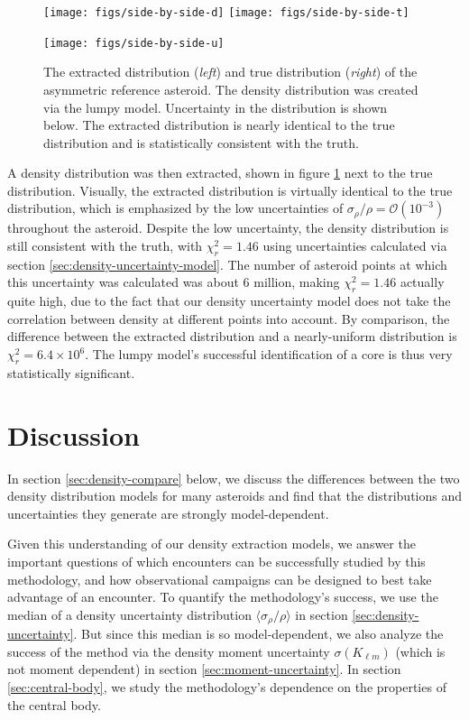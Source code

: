 \documentclass[fleqn,usenatbib]{mnras}
\begin{document}
\begin{figure}
  \centering
  \texttt{[image: figs/side-by-side-d]}\hfill
  \texttt{[image: figs/side-by-side-t]}

  \texttt{[image: figs/side-by-side-u]}
  \caption{The extracted distribution (\textit{left}) and true distribution (\textit{right}) of the asymmetric reference asteroid. The density distribution was created via the lumpy model. Uncertainty in the distribution is shown below. The extracted distribution is nearly identical to the true distribution and is statistically consistent with the truth.}
  \label{fig:den-side-by-side}
\end{figure}

A density distribution was then extracted, shown in figure \ref{fig:den-side-by-side} next to the true distribution. Visually, the extracted distribution is virtually identical to the true distribution, which is emphasized by the low uncertainties of $\sigma_\rho / \rho = \mathcal{O}(10^{-3})$ throughout the asteroid. Despite the low uncertainty, the density distribution is still consistent with the truth, with $\chi^2_r = 1.46$ using uncertainties calculated via section \ref{sec:density-uncertainty-model}. The number of asteroid points at which this uncertainty was calculated was about 6 million, making $\chi^2_r = 1.46$ actually quite high, due to the fact that our density uncertainty model does not take the correlation between density at different points into account. By comparison, the difference between the extracted distribution and a nearly-uniform distribution is $\chi^2_r = 6.4 \times 10^{6}$. The lumpy model's successful identification of a core is thus very statistically significant.



\section{Discussion}
\label{sec:discussion}
In section \ref{sec:density-compare} below, we discuss the differences between the two density distribution models for many asteroids and find that the distributions and uncertainties they generate are strongly model-dependent.

Given this understanding of our density extraction models, we answer the important questions of which encounters can be successfully studied by this methodology, and how observational campaigns can be designed to best take advantage of an encounter. To quantify the methodology's success, we use the median of a density uncertainty distribution $\langle \sigma_\rho / \rho \rangle$ in section \ref{sec:density-uncertainty}. But since this median is so model-dependent, we also analyze the success of the method via the density moment uncertainty $\sigma (K_{\ell m})$ (which is not moment dependent) in section \ref{sec:moment-uncertainty}. In section \ref{sec:central-body}, we study the methodology's dependence on the properties of the central body.
\end{document}
